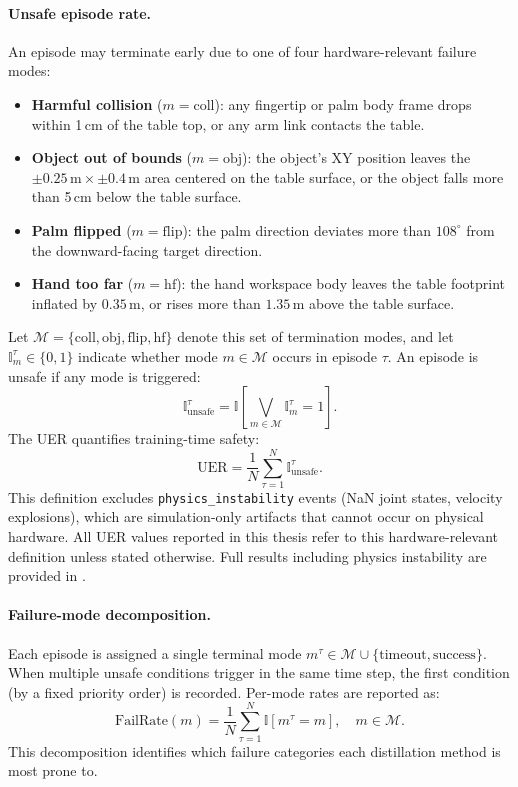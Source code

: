 \paragraph{Unsafe episode rate.}
An episode may terminate early due to one of four hardware-relevant failure modes:
\begin{itemize}
    \item \textbf{Harmful collision} ($m = \text{coll}$): any fingertip or palm body frame drops within 1\,cm of the table top, or any arm link contacts the table.
    \item \textbf{Object out of bounds} ($m = \text{obj}$): the object's XY position leaves the $\pm0.25\,\mathrm{m}\times\pm0.4\,\mathrm{m}$ area centered on the table surface, or the object falls more than 5\,cm below the table surface.
    \item \textbf{Palm flipped} ($m = \text{flip}$): the palm direction deviates more than $108^{\circ}$ from the downward-facing target direction.
    \item \textbf{Hand too far} ($m = \text{hf}$): the hand workspace body leaves the table footprint inflated by $0.35\,\mathrm{m}$, or rises more than $1.35\,\mathrm{m}$ above the table surface.
\end{itemize}
Let $\mathcal{M} = \{\text{coll}, \text{obj}, \text{flip}, \text{hf}\}$ denote this set of termination modes, and let $\mathbb{I}^{\tau}_{m} \in \{0,1\}$ indicate whether mode $m \in \mathcal{M}$ occurs in episode $\tau$.
An episode is unsafe if any mode is triggered:
%
\begin{equation}\label{eq:unsafe}
    \mathbb{I}^{\tau}_{\text{unsafe}} = \mathbb{I}\!\left[\bigvee_{m \in \mathcal{M}} \mathbb{I}^{\tau}_{m} = 1\right].
\end{equation}
%
The \ac{UER} quantifies training-time safety:
%
\begin{equation}\label{eq:uer}
    \text{UER} = \frac{1}{N} \sum_{\tau=1}^{N} \mathbb{I}^{\tau}_{\text{unsafe}}.
\end{equation}
%
This definition excludes \texttt{physics\_instability} events (NaN joint states, velocity explosions), which are simulation-only artifacts that cannot occur on physical hardware.
All \ac{UER} values reported in this thesis refer to this hardware-relevant definition unless stated otherwise.
Full results including physics instability are provided in .

\paragraph{Failure-mode decomposition.}
Each episode is assigned a single terminal mode $m^\tau \in \mathcal{M} \cup \{\text{timeout}, \text{success}\}$.
When multiple unsafe conditions trigger in the same time step, the first condition (by a fixed priority order) is recorded.
Per-mode rates are reported as:
%
\begin{equation}\label{eq:failure_mode}
    \text{FailRate}(m) = \frac{1}{N} \sum_{\tau=1}^{N} \mathbb{I}[m^\tau = m], \quad m \in \mathcal{M}.
\end{equation}
%
This decomposition identifies which failure categories each distillation method is most prone to.

